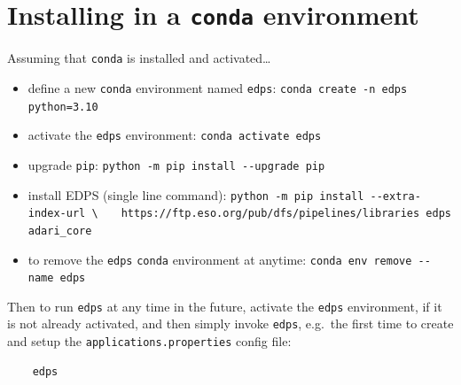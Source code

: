 \appendix
\appendix
\section{Installing in a \texttt{conda} environment}
\label{conda_install}

Assuming that \texttt{conda} is installed and activated\ldots

\begin{itemize}

    \item define a new \texttt{conda} environment named {\tt edps}:\newline
    \verb|conda create -n edps python=3.10|

   \item activate the \texttt{edps} environment: \newline
    \verb|conda activate edps|

   \item upgrade {\tt pip}:\newline
   \verb|python -m pip install --upgrade pip|

   \item install EDPS (single line command): \newline
   \verb|python -m pip install --extra-index-url \|\newline
   \verb|   https://ftp.eso.org/pub/dfs/pipelines/libraries edps adari_core|

   \item to remove the \texttt{edps} \texttt{conda} environment at anytime:\newline
   \verb|conda env remove --name edps|

\end{itemize}

Then to run \texttt{edps} at any time in the future, activate the \texttt{edps} environment, if it is not already activated, and then simply invoke \texttt{edps}, e.g.\ the first time to create and setup the \texttt{applications.properties} config file:
\begin{verbatim}
    edps
\end{verbatim}
